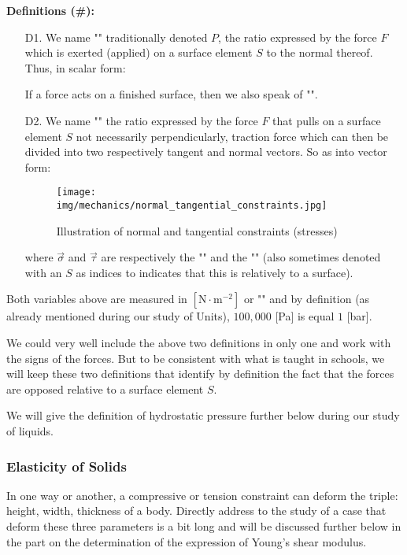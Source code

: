 	\textbf{Definitions (\#\mydef):}
	\begin{enumerate}
		\item[D1.] We name "" traditionally denoted $P$, the ratio expressed by the force $F$ which is exerted (applied) on a surface element $S$ to the normal thereof. Thus, in scalar form:
		
		\begin{tcolorbox}[title=Remark,colframe=black,arc=10pt]
		If a force acts on a finished surface, then we also speak of "".
		\end{tcolorbox}
		
		\item[D2.] We name "" the ratio expressed by the force $F$ that pulls on a surface element $S$ not necessarily perpendicularly, traction force  which can then be divided into two respectively tangent and normal vectors. So as into vector form:
		
		\begin{figure}[H]
			\centering
			\texttt{[image: img/mechanics/normal\_tangential\_constraints.jpg]}
			\caption{Illustration of normal and tangential constraints (stresses)}
		\end{figure}
		where $\vec{\sigma}$ and $\vec{\tau}$ are respectively the "" and the "" (also sometimes denoted with an $S$ as indices to indicates that this is relatively to a surface).
	\end{enumerate}
	Both variables above are measured in $[\text{N}\cdot \text{m}^{-2}]$ or "" and by definition (as already mentioned during our study of Units), $100,000$ [Pa] is equal $1$ [bar].
	
	We could very well include the above two definitions in only one and work with the signs of the forces. But to be consistent with what is taught in schools, we will keep these two definitions that identify by definition the fact that the forces are opposed relative to a surface element $S$.
	\begin{tcolorbox}[title=Remark,colframe=black,arc=10pt]
	We will give the definition of hydrostatic pressure further below during our study of liquids.
	\end{tcolorbox}
	
	\subsubsection{Elasticity of Solids}
	In one way or another, a compressive or tension constraint can deform the triple: height, width, thickness of a body. Directly address to the study of a case that deform these three parameters is a bit long and will be discussed further below in the part on the determination of the expression of Young's shear modulus.
	

